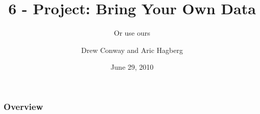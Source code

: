\documentclass[xcolor=dvipsnames, 9pt]{beamer}
\title{6 - Project: Bring Your Own Data}
\subtitle{Or use ours}
\author{Drew Conway and Aric Hagberg}
\date{June 29, 2010}
\begin{document}
\begin{frame}[plain]
\titlepage
\end{frame}

\begin{frame}
\frametitle{Overview}

\end{frame}
\end{document}
